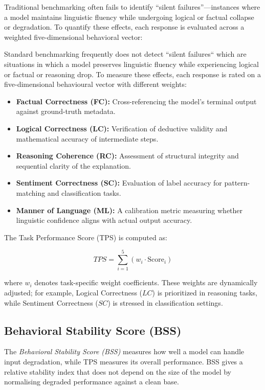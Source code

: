\documentclass[conference]{IEEEtran}
\begin{document}
Traditional benchmarking often fails to identify ``silent failures''—instances where a model maintains linguistic fluency while undergoing logical or factual collapse or degradation. To quantify these effects, each response is evaluated across a weighted five-dimensional behavioral vector:

Standard benchmarking frequently does not detect ``silent failures`` which are situations in which a model preserves linguistic fluency while experiencing logical or factual or reasoning drop. To measure these effects, each response is rated on a five-dimensional behavioural vector with different weights:

\begin{itemize}
\item \textbf{Factual Correctness (FC):} Cross-referencing the model’s terminal output against ground-truth metadata.
\item \textbf{Logical Correctness (LC):} Verification of deductive validity and mathematical accuracy of intermediate steps.
\item \textbf{Reasoning Coherence (RC):} Assessment of structural integrity and sequential clarity of the explanation.
\item \textbf{Sentiment Correctness (SC):} Evaluation of label accuracy for pattern-matching and classification tasks.
\item \textbf{Manner of Language (ML):} A calibration metric measuring whether linguistic confidence aligns with actual output accuracy.
\end{itemize}

The Task Performance Score (TPS) is computed as:

\begin{equation}
TPS = \sum_{i=1}^{5} \left( w_i \cdot \text{Score}_i \right)
\end{equation}

where $w_i$ denotes task-specific weight coefficients. These weights are dynamically adjusted; for example, Logical Correctness ($LC$) is prioritized in reasoning tasks, while Sentiment Correctness ($SC$) is stressed in classification settings.

\subsection{Behavioral Stability Score (BSS)}

The \textit{Behavioral Stability Score (BSS)} measures how well a model can handle input degradation, while TPS measures its overall performance. BSS gives a relative stability index that does not depend on the size of the model by normalising degraded performance against a clean base.
\end{document}

